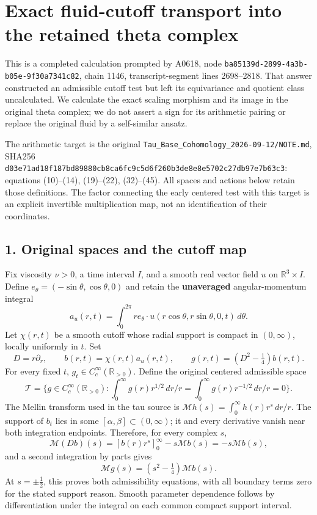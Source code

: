 \section{Exact fluid-cutoff transport into the retained theta
complex}\label{exact-fluid-cutoff-transport-into-the-retained-theta-complex}

This is a completed calculation prompted by A0618, node
\texttt{ba85139d-2899-4a3b-b05e-9f30a7341c82}, chain 1146,
transcript-segment lines 2698--2818. That answer constructed an
admissible cutoff test but left its equivariance and quotient class
uncalculated. We calculate the exact scaling morphism and its image in
the original theta complex; we do not assert a sign for its arithmetic
pairing or replace the original fluid by a self-similar ansatz.

The arithmetic target is the original
\texttt{Tau\_Base\_Cohomology\_2026-09-12/NOTE.md}, SHA256
\texttt{d03e71ad18f187bd89880cb8ca6fc9c5d6f260b3de8e8e5702c27db97e7b63c3}:
equations (10)--(14), (19)--(22), (32)--(45). All spaces and actions
below retain those definitions. The factor connecting the early centered
test with this target is an explicit invertible multiplication map, not
an identification of their coordinates.

\subsection{1. Original spaces and the cutoff
map}\label{original-spaces-and-the-cutoff-map}

Fix viscosity \(\nu>0\), a time interval \(I\), and a smooth real vector
field \(u\) on \(\mathbb R^3\times I\). Define
\(e_\theta=(-\sin\theta,\cos\theta,0)\) and retain the
\textbf{unaveraged} angular-momentum integral \[
a_u(r,t)=\int_0^{2\pi}r e_\theta\cdot u(r\cos\theta,r\sin\theta,0,t)\,d\theta.
\] Let \(\chi(r,t)\) be a smooth cutoff whose radial support is compact
in \((0,\infty)\), locally uniformly in \(t\). Set \[
D=r\partial_r,\qquad b(r,t)=\chi(r,t)a_u(r,t),\qquad
g(r,t)=(D^2-\tfrac14)b(r,t).
\] For every fixed \(t\), \(g_t\in C_c^\infty(\mathbb R_{>0})\). Define
the original centered admissible space \[
\mathscr T=\{g\in C_c^\infty(\mathbb R_{>0}):\int_0^\infty g(r)r^{1/2}\,dr/r=\int_0^\infty g(r)r^{-1/2}\,dr/r=0\}.
\] The Mellin transform used in the tau source is
\(\mathcal M h(s)=\int_0^\infty h(r)r^s\,dr/r\). The support of \(b_t\)
lies in some \([\alpha,\beta]\subset(0,\infty)\); it and every
derivative vanish near both integration endpoints. Therefore, for every
complex \(s\), \[
\mathcal M(Db)(s)=[b(r)r^s]_0^\infty-s\mathcal Mb(s)=-s\mathcal Mb(s),
\] and a second integration by parts gives \[
\mathcal Mg(s)=(s^2-\tfrac14)\mathcal Mb(s).
\tag{1}
\] At \(s=\pm\tfrac12\), this proves both admissibility equations, with
all boundary terms zero for the stated support reason. Smooth parameter
dependence follows by differentiation under the integral on each common
compact support interval.

